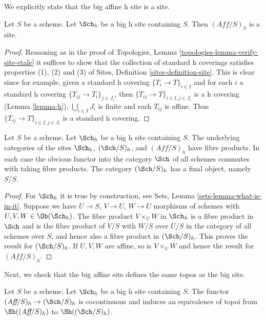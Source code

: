 \noindent
We explicitly state that the big affine h site is a site.

\begin{lemma}
\label{lemma-verify-site-h}
Let $S$ be a scheme. Let $\Sch_h$ be a big h
site containing $S$. Then $(\textit{Aff}/S)_h$ is a site.
\end{lemma}

\begin{proof}
Reasoning as in the proof of
Topologies, Lemma \ref{topologies-lemma-verify-site-etale}
it suffices to show that the collection of standard h coverings
satisfies properties (1), (2) and (3) of
Sites, Definition \ref{sites-definition-site}.
This is clear since for example, given a standard h covering
$\{T_i \to T\}_{i\in I}$ and for each
$i$ a standard h covering $\{T_{ij} \to T_i\}_{j \in J_i}$, then
$\{T_{ij} \to T\}_{i \in I, j\in J_i}$ is a h covering
(Lemma \ref{lemma-h}), $\bigcup_{i\in I} J_i$ is finite and
each $T_{ij}$ is affine. Thus $\{T_{ij} \to T\}_{i \in I, j\in J_i}$
is a standard h covering.
\end{proof}

\begin{lemma}
\label{lemma-fibre-products-h}
Let $S$ be a scheme. Let $\Sch_h$ be a big h
site containing $S$. The underlying categories of the sites
$\Sch_h$, $(\Sch/S)_h$, and $(\textit{Aff}/S)_h$ have fibre products.
In each case the obvious functor into the category $\Sch$ of
all schemes commutes with taking fibre products. The category
$(\Sch/S)_h$ has a final object, namely $S/S$.
\end{lemma}

\begin{proof}
For $\Sch_h$ it is true by construction, see
Sets, Lemma \ref{sets-lemma-what-is-in-it}.
Suppose we have $U \to S$, $V \to U$, $W \to U$ morphisms
of schemes with $U, V, W \in \Ob(\Sch_h)$.
The fibre product $V \times_U W$ in $\Sch_h$
is a fibre product in $\Sch$ and
is the fibre product of $V/S$ with $W/S$ over $U/S$ in
the category of all schemes over $S$, and hence also a
fibre product in $(\Sch/S)_h$.
This proves the result for $(\Sch/S)_h$.
If $U, V, W$ are affine, so is $V \times_U W$ and hence the
result for $(\textit{Aff}/S)_h$.
\end{proof}

\noindent
Next, we check that the big affine site defines the same
topos as the big site.

\begin{lemma}
\label{lemma-affine-big-site-h}
Let $S$ be a scheme. Let $\Sch_h$ be a big h
site containing $S$.
The functor $(\textit{Aff}/S)_h \to (\Sch/S)_h$
is cocontinuous and induces an equivalence of topoi from
$\Sh((\textit{Aff}/S)_h)$ to
$\Sh((\Sch/S)_h)$.
\end{lemma}

